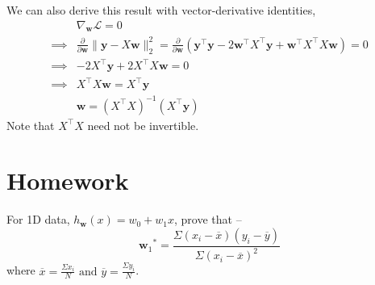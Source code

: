 \documentclass{report}
\newcommand{\tr}[1]{{{#1}^\top}} %
\newcommand{\w}{\mathbf{w}} %
\newcommand{\y}{\mathbf{y}}
\newcommand{\loss}{\mathcal{L}}
\begin{document}
We can also derive this result with vector-derivative identities\footnotemark[1],
\begin{align*}
           & \nabla_\w\loss = 0                                                                                                                                       \\
  \implies & \frac{\partial }{\partial \w} \lVert \y-X\w\rVert_2^2 = \frac{\partial}{\partial \w}\left(\tr{\y}\y - 2\tr{\w} \tr{X} \y + \tr{\w} \tr{X} X\w\right) = 0 \\
  \implies & -2\tr{X} \y + 2\tr{X}X\w = 0                                                                                                                             \\
  \implies & \tr{X}X\w = \tr{X}\y                                                                                                                                     \\
           & \boxed{\w = (\tr{X} X)^{-1}(\tr{X} \y)}
\end{align*}
Note that \(\tr{X}X\) need not be invertible.

\section{Homework}
For 1D data, $ h_\w(x)=w_0+w_1 x $,
prove that --
\begin{equation*}
  {\w_1}^* = \frac{\Sigma (x_i-\overline{x})(y_i-\overline{y})}{\Sigma (x_i-\overline{x})^2}
\end{equation*}
\noindent
where \(\overline{x} = \frac{\Sigma{x_i}}{N} \text{ \ and \ } \overline{y} = \frac{\Sigma{y_i}}{N}\).

\end{document}
